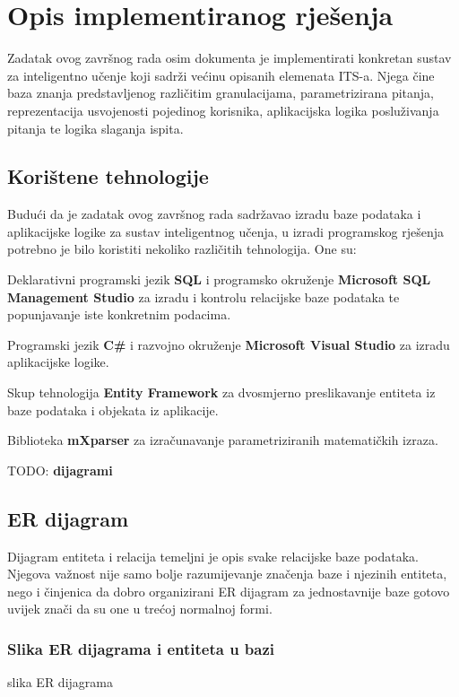 \documentclass[times, utf8, zavrsni]{fer}
\begin{document}
\chapter{Opis implementiranog rješenja}
Zadatak ovog završnog rada osim dokumenta je implementirati konkretan sustav za inteligentno učenje koji sadrži većinu opisanih elemenata ITS-a. Njega čine baza znanja predstavljenog različitim granulacijama, parametrizirana pitanja, reprezentacija usvojenosti pojedinog korisnika, aplikacijska logika posluživanja pitanja te logika slaganja ispita.

\section{Korištene tehnologije}

Budući da je zadatak ovog završnog rada sadržavao izradu baze podataka i aplikacijske logike za sustav inteligentnog učenja, u izradi programskog rješenja potrebno je bilo koristiti nekoliko različitih tehnologija. One su:
\par
Deklarativni programski jezik \textbf{SQL} i programsko okruženje \textbf{Microsoft SQL Management Studio} za izradu i kontrolu relacijske baze podataka te popunjavanje iste konkretnim podacima.
\par
Programski jezik \textbf{C\#} i razvojno okruženje \textbf{Microsoft Visual Studio} za izradu aplikacijske logike.
\par
Skup tehnologija \textbf{Entity Framework} za dvosmjerno preslikavanje entiteta iz baze podataka i objekata iz aplikacije.
\par
Biblioteka \textbf{mXparser} za izračunavanje parametriziranih matematičkih izraza.
\par
TODO: \textbf{dijagrami}

\section{ER dijagram}
Dijagram entiteta i relacija temeljni je opis svake relacijske baze podataka. Njegova važnost nije samo bolje razumijevanje značenja baze i njezinih entiteta, nego i činjenica da dobro organizirani ER dijagram za jednostavnije baze gotovo uvijek znači da su one u trećoj normalnoj formi.

\pagebreak
\subsection{Slika ER dijagrama i entiteta u bazi}
slika ER dijagrama
\end{document}
